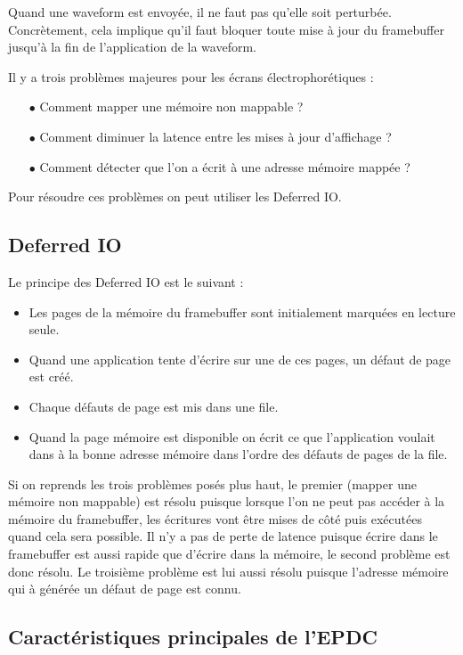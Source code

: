 Quand une waveform est envoyée, il ne faut pas qu'elle soit perturbée. Concrètement, cela implique qu'il faut bloquer toute mise à jour du framebuffer jusqu'à la fin de l'application de la waveform.

Il y a trois problèmes majeures pour les écrans électrophorétiques :
\begin{itemize}
	\item[$\bullet$] Comment mapper une mémoire non mappable ?
	\item[$\bullet$] Comment diminuer la latence entre les mises à jour d'affichage ?
	\item[$\bullet$] Comment détecter que l'on a écrit à une adresse mémoire mappée ?
\end{itemize}

Pour résoudre ces problèmes on peut utiliser les Deferred IO.

\newpage

\subsection{Deferred IO}

Le principe des Deferred IO est le suivant :
\begin{itemize}
\renewcommand{\labelitemi}{$\bullet$}
	\item Les pages de la mémoire du framebuffer sont initialement marquées en lecture seule.
	\item Quand une application tente d'écrire sur une de ces pages, un défaut de page est créé.
	\item Chaque défauts de page est mis dans une file.
	\item Quand la page mémoire est disponible on écrit ce que l'application voulait dans à la bonne adresse mémoire dans l'ordre des défauts de pages de la file. 
\end{itemize} 

Si on reprends les trois problèmes posés plus haut, le premier (mapper une mémoire non mappable) est résolu puisque lorsque l'on ne peut pas accéder à la mémoire du framebuffer, les écritures vont être mises de côté puis exécutées quand cela sera possible. 
Il n'y a pas de perte de latence puisque écrire dans le framebuffer est aussi rapide que d'écrire dans la mémoire, le second problème est donc résolu.
Le troisième problème est lui aussi résolu puisque l'adresse mémoire qui à générée un défaut de page est connu.
\subsection{Caractéristiques principales de l'EPDC}

